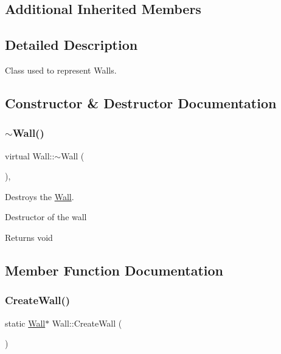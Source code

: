 \subsection*{Additional Inherited Members}


\subsection{Detailed Description}
Class used to represent Walls. 

\subsection{Constructor \& Destructor Documentation}
\mbox{\label{class_wall_a794dcff9a7ee62de3e8db816424e0050}} 
\subsubsection{\texorpdfstring{$\sim$\+Wall()}{~Wall()}}
{\footnotesize\ttfamily virtual Wall\+::$\sim$\+Wall (\begin{DoxyParamCaption}{ }\end{DoxyParamCaption})\hspace{0.3cm}{\ttfamily [inline]}, {\ttfamily [virtual]}}



Destroys the \hyperlink{class_wall}{Wall}. 

Destructor of the wall

\begin{DoxyReturn}{Returns}
void 
\end{DoxyReturn}


\subsection{Member Function Documentation}
\mbox{\label{class_wall_a7f2063fe4fd2f49ebc64f5a6a873bfa3}} 
\subsubsection{\texorpdfstring{Create\+Wall()}{CreateWall()}}
{\footnotesize\ttfamily static \hyperlink{class_wall}{Wall}$\ast$ Wall\+::\+Create\+Wall (\begin{DoxyParamCaption}{ }\end{DoxyParamCaption})\hspace{0.3cm}{\ttfamily [static]}}



